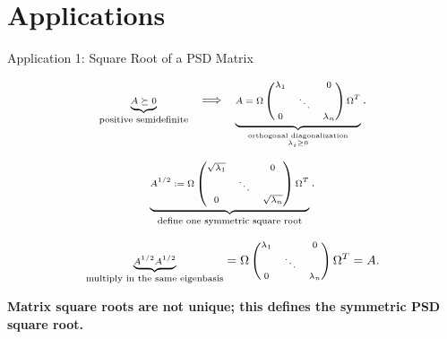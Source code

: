 \documentclass[10pt]{beamer}
\theoremstyle{definition}
\newcommand{\x}[1]{\alert{\textbf{#1}}}
\begin{document}
\section{Applications}

\begin{frame}[shrink=8]{Application 1: Square Root of a PSD Matrix}

\[
\scriptsize
\underbrace{A\succeq0}_{\text{positive semidefinite}}
\quad\Longrightarrow\quad
\underbrace{
A=
\Omega
\begin{pmatrix}
\lambda_1&&0\\
&\ddots&\\
0&&\lambda_n
\end{pmatrix}
\Omega^T}_{\substack{\text{orthogonal diagonalization}\\\lambda_i\ge0}}.
\]

\vfill

\[
\scriptsize
\underbrace{
A^{1/2}
:=
\Omega
\begin{pmatrix}
\sqrt{\lambda_1}&&0\\
&\ddots&\\
0&&\sqrt{\lambda_n}
\end{pmatrix}
\Omega^T}_{\text{define one symmetric square root}}.
\]

\vfill

\[
\scriptsize
\underbrace{A^{1/2}A^{1/2}}_{\text{multiply in the same eigenbasis}}
=
\Omega
\begin{pmatrix}
\lambda_1&&0\\
&\ddots&\\
0&&\lambda_n
\end{pmatrix}
\Omega^T
=A.
\]

\vfill

\begin{center}
\x{Matrix square roots are not unique; this defines the symmetric PSD square root.}
\end{center}

\end{frame}
\end{document}
